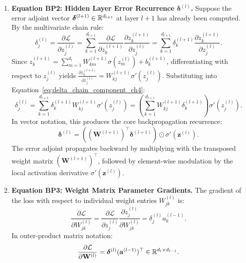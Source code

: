 \begin{enumerate}[noitemsep,topsep=2pt,parsep=0pt,partopsep=0pt]
  \item \textbf{Equation BP2: Hidden Layer Error Recurrence $\boldsymbol{\delta}^{(l)}$.}
  Suppose the error adjoint vector $\boldsymbol{\delta}^{(l+1)} \in \mathbb{R}^{d_{l+1}}$ at layer $l+1$ has already been computed. By the multivariate chain rule:
  \begin{equation}
  \delta_j^{(l)} = \frac{\partial \mathcal{L}}{\partial z_j^{(l)}} = \sum_{k=1}^{d_{l+1}} \frac{\partial \mathcal{L}}{\partial z_k^{(l+1)}} \frac{\partial z_k^{(l+1)}}{\partial z_j^{(l)}} = \sum_{k=1}^{d_{l+1}} \delta_k^{(l+1)} \frac{\partial z_k^{(l+1)}}{\partial z_j^{(l)}}.
  \label{eq:delta_chain_component_ch4}
  \end{equation}
  Since $z_k^{(l+1)} = \sum_{m=1}^{d_l} W_{km}^{(l+1)} \sigma(z_m^{(l)}) + b_k^{(l+1)}$, differentiating with respect to $z_j^{(l)}$ yields $\frac{\partial z_k^{(l+1)}}{\partial z_j^{(l)}} = W_{kj}^{(l+1)} \sigma'(z_j^{(l)})$. Substituting into Equation~\eqref{eq:delta_chain_component_ch4}:
  \begin{equation}
  \delta_j^{(l)} = \sum_{k=1}^{d_{l+1}} \delta_k^{(l+1)} W_{kj}^{(l+1)} \sigma'\left( z_j^{(l)} \right) = \left( \sum_{k=1}^{d_{l+1}} W_{kj}^{(l+1)} \delta_k^{(l+1)} \right) \sigma'\left( z_j^{(l)} \right).
  \end{equation}
  In vector notation, this produces the core backpropagation recurrence:
  \begin{equation}
  \boldsymbol{\delta}^{(l)} = \left( (\mathbf{W}^{(l+1)})^\top \boldsymbol{\delta}^{(l+1)} \right) \odot \sigma'\left( \mathbf{z}^{(l)} \right).
  \label{eq:bp2_error_recurrence}
  \end{equation}
  The error adjoint propagates backward by multiplying with the transposed weight matrix $(\mathbf{W}^{(l+1)})^\top$, followed by element-wise modulation by the local activation derivative $\sigma'(\mathbf{z}^{(l)})$.

  \item \textbf{Equation BP3: Weight Matrix Parameter Gradients.}
  The gradient of the loss with respect to individual weight entries $W_{jk}^{(l)}$ is:
  \begin{equation}
  \frac{\partial \mathcal{L}}{\partial W_{jk}^{(l)}} = \frac{\partial \mathcal{L}}{\partial z_j^{(l)}} \frac{\partial z_j^{(l)}}{\partial W_{jk}^{(l)}} = \delta_j^{(l)} a_k^{(l-1)}.
  \end{equation}
  In outer-product matrix notation:
  \begin{equation}
  \frac{\partial \mathcal{L}}{\partial \mathbf{W}^{(l)}} = \boldsymbol{\delta}^{(l)} (\mathbf{a}^{(l-1)})^\top \in \mathbb{R}^{d_l \times d_{l-1}}.
  \label{eq:grad_weight_matrix}
  \end{equation}


\end{enumerate}
